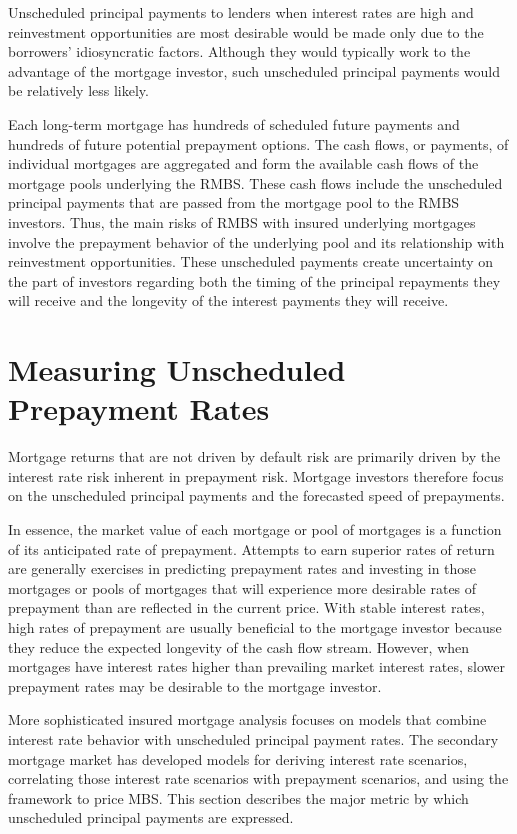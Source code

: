 \documentclass[11pt]{article}
\begin{document}
Unscheduled principal payments to lenders when interest rates are high and reinvestment opportunities are most desirable would be made only due to the borrowers' idiosyncratic factors. Although they would typically work to the advantage of the mortgage investor, such unscheduled principal payments would be relatively less likely.

Each long-term mortgage has hundreds of scheduled future payments and hundreds of future potential prepayment options. The cash flows, or payments, of individual mortgages are aggregated and form the available cash flows of the mortgage pools underlying the RMBS. These cash flows include the unscheduled principal payments that are passed from the mortgage pool to the RMBS investors. Thus, the main risks of RMBS with insured underlying mortgages involve the prepayment behavior of the underlying pool and its relationship with reinvestment opportunities. These unscheduled payments create uncertainty on the part of investors regarding both the timing of the principal repayments they will receive and the longevity of the interest payments they will receive.

\section*{Measuring Unscheduled Prepayment Rates}
Mortgage returns that are not driven by default risk are primarily driven by the interest rate risk inherent in prepayment risk. Mortgage investors therefore focus on the unscheduled principal payments and the forecasted speed of prepayments.

In essence, the market value of each mortgage or pool of mortgages is a function of its anticipated rate of prepayment. Attempts to earn superior rates of return are generally exercises in predicting prepayment rates and investing in those mortgages or pools of mortgages that will experience more desirable rates of prepayment than are reflected in the current price. With stable interest rates, high rates of prepayment are usually beneficial to the mortgage investor because they reduce the expected longevity of the cash flow stream. However, when mortgages have interest rates higher than prevailing market interest rates, slower prepayment rates may be desirable to the mortgage investor.

More sophisticated insured mortgage analysis focuses on models that combine interest rate behavior with unscheduled principal payment rates. The secondary mortgage market has developed models for deriving interest rate scenarios, correlating those interest rate scenarios with prepayment scenarios, and using the framework to price MBS. This section describes the major metric by which unscheduled principal payments are expressed.
\end{document}
